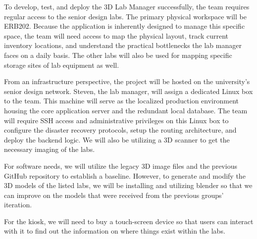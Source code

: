 To develop, test, and deploy the 3D Lab Manager successfully, the team requires regular access to the senior design labs. The primary physical workspace will be ERB202. Because the application is inherently designed to manage this specific space, the team will need access to map the physical layout, track current inventory locations, and understand the practical bottlenecks the lab manager faces on a daily basis. The other labs will also be used for mapping specific storage sites of lab equipment as well. 

From an infrastructure perspective, the project will be hosted on the university's senior design network. Steven, the lab manager, will assign a dedicated Linux box to the team. This machine will serve as the localized production environment housing the core application server and the redundant local database. The team will require SSH access and administrative privileges on this Linux box to configure the disaster recovery protocols, setup the routing architecture, and deploy the backend logic. We will also be utilizing a 3D scanner to get the necessary imaging of the labs.

For software needs, we will utilize the legacy 3D image files and the previous GitHub repository to establish a baseline. However, to generate and modify the 3D models of the listed labs, we will be installing and utilizing blender so that we can improve on the models that were received from the previous groups'  iteration.

For the kiosk, we will need to buy a touch-screen device so that users can interact with it to find out the information on where things exist within the labs.
